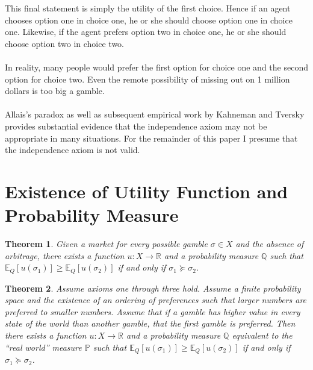 \documentclass{article}
\newtheorem{theorem}{Theorem}
\begin{document}
This final statement is simply the utility of the first choice.  Hence if an agent chooses option one in choice one, he or she should choose option one in choice one.  Likewise, if the agent prefers option two in choice one, he or she should choose option two in choice two.
\\
\\
In reality, many people would prefer the first option for choice one and the second option for choice two.  Even the remote possibility of missing out on 1 million dollars is too big a gamble. 
\\
\\
Allais's paradox as well as subsequent empirical work by Kahneman and Tversky provides substantial evidence that the independence axiom may not be appropriate in many situations.  For the remainder of this paper I presume that the independence axiom is not valid.  

 
\section{Existence of Utility Function and Probability Measure}

\begin{theorem}
	Given a market for every possible gamble \(\sigma \in X\) and the absence of arbitrage, there exists a function \(u: X \to \mathbb{R}\) and a probability measure \(\mathbb{Q}\) such that \(\mathbb{E}_Q\left[u(\sigma_1)\right] \geq \mathbb{E}_Q\left[u(\sigma_2)\right]\) if and only if \(\sigma_1 \succeq \sigma_2\).  
\end{theorem}
	
	
\begin{theorem}
Assume axioms one through three hold.  Assume a finite probability space and the existence of an ordering of preferences such that larger numbers are preferred to smaller numbers.  Assume that if a gamble has higher value in every state of the world than another gamble, that the first gamble is preferred.  Then there exists a function \(u: X \to \mathbb{R}\) and a probability measure \(\mathbb{Q}\) equivalent to the ``real world'' measure \(\mathbb{P}\) such that \(\mathbb{E}_Q\left[u(\sigma_1)\right] \geq \mathbb{E}_Q\left[u(\sigma_2)\right]\) if and only if \(\sigma_1 \succeq \sigma_2\).  
\end{theorem}
\end{document}
